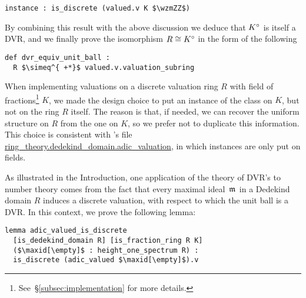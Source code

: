 \documentclass[sigplan,10pt, nonacm, review]{acmart}
\begin{document}
\begin{lstlisting}[caption={The valuation on a DVR is discrete.}, label={code:discrete_on_DVR}]
instance : is_discrete (valued.v K $\wzmZZ$)
\end{lstlisting}
By combining this result with the above discussion we deduce that ${K}^\circ$ is itself a DVR, and we finally prove the isomorphism $R\cong{K}^\circ$ in the form of the following\href{https://github.com/LCFT-Lean/local_fields/blob/76ad487d09babdb0018f394a5634526637ee014a/src/discrete_valuation_ring/basic.lean#L518}{\extlink} 
\begin{lstlisting}
def dvr_equiv_unit_ball : 
  R $\simeq^{ +*}$ valued.v.valuation_subring
\end{lstlisting}

\begin{remark}
When implementing valuations on a discrete valuation ring $R$ with field of fractions\footnote{See~\S\ref{subsec:implementation} for more details.} $K$, we made the design choice to put an instance of the  class on $K$, but not on the ring $R$ itself. The reason is that, if needed, we can recover the
uniform structure on $R$ from the one on $K$, so we prefer not to duplicate this information. This choice is consistent with \mathlib's file \url{ring\_theory.dedekind\_domain.adic\_valuation}\href{https://leanprover-community.github.io/mathlib_docs/ring_theory/dedekind_domain/adic_valuation.html}{\extlink}, in which  instances are only put on fields.
\end{remark}

As illustrated in the Introduction, one application of the theory of DVR's to number theory comes from the fact that every maximal ideal~$\maxid[\empty]$ in a Dedekind domain $R$ induces a discrete valuation, with respect to which the unit ball is a DVR. In this context, we prove the following lemma:\href{https://github.com/LCFT-Lean/local_fields/blob/76ad487d09babdb0018f394a5634526637ee014a/src/discrete_valuation_ring/global_to_local.lean#L23}{\extlink}
\begin{lstlisting}
lemma adic_valued_is_discrete
  [is_dedekind_domain R] [is_fraction_ring R K]
  ($\maxid[\empty]$ : height_one_spectrum R) :
  is_discrete (adic_valued $\maxid[\empty]$).v
\end{lstlisting}

\end{document}
